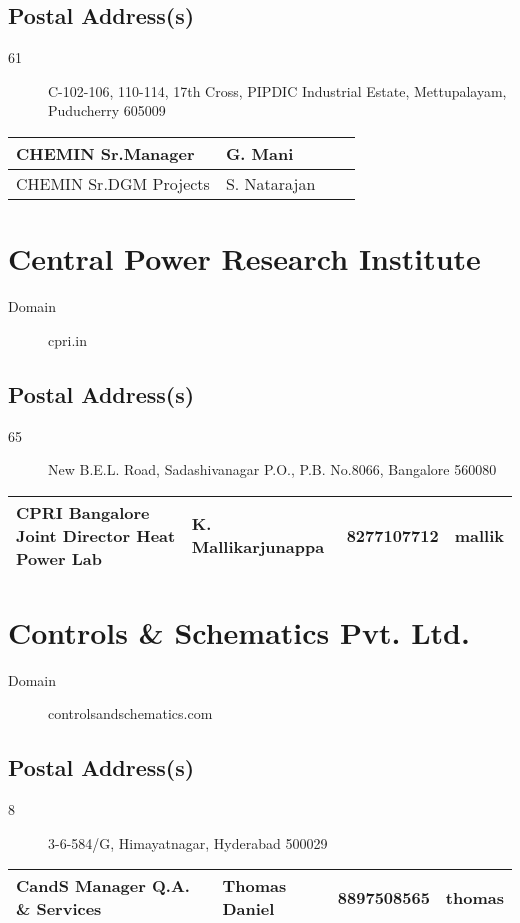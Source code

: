 \documentclass[a4paper, 11pt, twoside]{book}
\begin{document}
\subsection*{Postal Address(s)}
\begin{description}
\item [61]C-102-106, 110-114, 17th Cross, PIPDIC Industrial Estate, Mettupalayam, Puducherry 605009
\end{description}
\begin{tabular}{|p{4cm}|p{2cm}|p{2cm}|p{3cm}|}
\hline
CHEMIN Sr.Manager & G. Mani &  &  \\ \hline
CHEMIN Sr.DGM Projects & S. Natarajan &  &  \\ \hline
\end{tabular}
\section{Central Power Research Institute}\label{com:17}
\begin{description}
\item[Domain]cpri.in
\end{description}
\subsection*{Postal Address(s)}
\begin{description}
\item [65]New B.E.L. Road, Sadashivanagar P.O., P.B. No.8066, Bangalore 560080
\end{description}
\begin{tabular}{|p{4cm}|p{2cm}|p{2cm}|p{3cm}|}
\hline
CPRI Bangalore Joint Director Heat Power Lab & K. Mallikarjunappa & 8277107712 & mallik \\ \hline
\end{tabular}
\section{Controls \& Schematics Pvt. Ltd.}\label{com:5}
\begin{description}
\item[Domain]controlsandschematics.com
\end{description}
\subsection*{Postal Address(s)}
\begin{description}
\item [8]3-6-584/G, Himayatnagar, Hyderabad 500029
\end{description}
\begin{tabular}{|p{4cm}|p{2cm}|p{2cm}|p{3cm}|}
\hline
CandS Manager Q.A. \& Services & Thomas Daniel & 8897508565 & thomas \\ \hline
\end{tabular}
\end{document}
